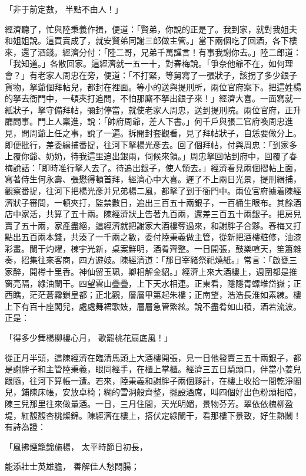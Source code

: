 「非于前定數，  半點不由人！」

經濟聽了，忙與陸秉義作揖，便道：「賢弟，你說的正是了。我到家，就對我姐夫和姐姐說。這買賣成了，就安賢弟同謝三郎做主管。」當下兩個吃了回酒，各下樓來，還了酒錢。經濟分付：「陸二哥，兄弟千萬謹言！有事我謝你去。」陸二郎道：「我知道。」各散回家。這經濟就一五一十，對春梅說。「爭奈他爺不在，如何理會？」有老家人周忠在旁，便道：「不打緊，等舅寫了一張狀子，該拐了多少銀子貨物，拏爺個拜帖兒，都封在裡面。等小的送與提刑所，兩位官府案下。把這姓楊的拏去衙門中，一頓夾打追問，不怕那廝不拏出銀子來！」經濟大喜。一面寫就一紙狀子，拏守備拜帖，彌封停當，就使老家人周忠，送到提刑院。兩位官府，正升廳問事。門上人稟進，說：「帥府周爺，差人下書。」何千戶與張二官府喚周忠進見，問周爺上任之事，說了一遍。拆開封套觀看，見了拜帖狀子，自恁要做分上。即便批行，差委緝捕番捉，往河下拏楊光彥去。回了個拜帖，付與周忠：「到家多上覆你爺、奶奶，待我這里追出銀兩，伺候來領。」周忠拏回帖到府中，回覆了春梅說話：「即時准行拏人去了。待追出銀子，使人領去。」經濟看見兩個摺帖上面，寫著侍生何永壽、張懋得頓首拜，經濟心中大喜。遲了不上兩日光景，提刑緝捕，觀察番捉，往河下把楊光彥并兄弟楊二風，都拏了到于衙門中。兩位官府據着陳經濟狀子審問，一頓夾打，監禁數日，追出三百五十兩銀子，一百桶生眼布。其餘酒店中家活，共算了五十兩。陳經濟狀上告著九百兩，還差三百五十兩銀子。把房兒賣了五十兩，家產盡絕，這經濟就把謝家大酒樓奪過來，和謝胖子合夥。春梅又打點出五百兩本錢，共湊了一千兩之數，委付陸秉義做主管，從新把酒樓粧修，油漆彩畫。闌干灼燿，棟宇光新，桌案鮮明，酒肴齊整。一日開張，鼓樂喧天，笙簫雜奏，招集往來客商，四方遊妓。陳經濟道：「那日宰豬祭祀燒紙。」常言：「啟甕三家醉，開樽十里香。神仙留玉珮，卿相解金貂。」經濟上來大酒樓上，週圍都是推窗亮隔，綠油闌干。四望雲山疊疊，上下天水相連。正東看，隱隱青螺堆岱嶽；正西瞧，茫茫蒼霧鎖皇都；正北觀，層層甲第起朱樓；正南望，浩浩長淮如素練。樓上下有百十座閣兒，處處舞裙歌妓，層層急管繁絃。說不盡肴如山積，酒若流波。正是：

「得多少舞楊柳樓心月，  歌罷桃花扇底風！」

從正月半頭，這陳經濟在臨清馬頭上大酒樓開張，見一日他發賣三五十兩銀子，都是謝胖子和主管陸秉義，眼同經手，在櫃上掌櫃。經濟三五日騎頭口，伴當小姜兒跟隨，往河下算帳一遭。若來，陸秉義和謝胖子兩個夥計，在樓上收拾一間乾淨閣兒，鋪陳床帳，安放卓椅；糊的雪洞般齊整，擺設酒席，叫四個好出色粉頭相陪，陳三兒那里往來做量酒。一日，三月住間，天光明媚，景物芬芳。翠依依槐柳盈堤，紅馥馥杏桃燦錦。陳經濟在樓上，搭伏定綠闌干，看那樓下景致，好生熱鬧！有詩為證：

「風拂煙籠錦施楊，  太平時節日初長，

能添壯士英雄膽，  善解佳人愁悶腸；

